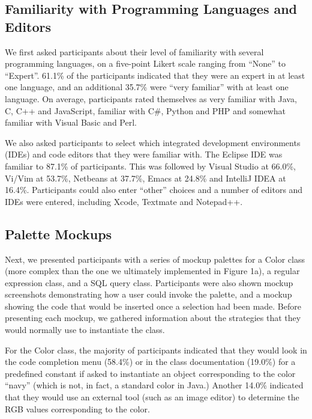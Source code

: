 \documentclass[10pt, conference, compsocconf]{IEEEtran}
\begin{document}
\subsection{Familiarity with Programming Languages and Editors}

We first asked participants about their level of familiarity with several programming languages, on a five-point Likert scale ranging from ``None'' to ``Expert''. 61.1\% of the participants indicated that they were an expert in at least one language, and an additional 35.7\% were ``very familiar'' with at least one language. On average, participants rated themselves as very familiar with Java, C, C++ and JavaScript, familiar with C\#, Python and PHP and somewhat familiar with Visual Basic and Perl.

We also asked participants to select which integrated development environments (IDEs) and code editors that they were familiar with. The Eclipse IDE was familiar to 87.1\% of participants. This was followed by Visual Studio at 66.0\%, Vi/Vim at 53.7\%, Netbeans at 37.7\%, Emacs at 24.8\% and IntelliJ IDEA at 16.4\%. Participants could also enter ``other'' choices and a number of editors and IDEs were entered, including Xcode, Textmate and Notepad++.

\subsection{Palette Mockups}

%
Next, we presented participants with a series of mockup palettes for a Color class (more complex than the one we ultimately implemented in Figure 1a), a regular expression class, and a SQL query class. Participants were also shown mockup screenshots demonstrating how a user could invoke the palette, and a mockup showing the code that would be inserted once a selection had been made. Before presenting each mockup, we gathered information about  the strategies that they would normally use to instantiate the class.

For the Color class, the majority of participants indicated that they would look in the code completion menu (58.4\%) or in the class documentation (19.0\%) for a predefined constant if asked to instantiate an object corresponding to the color ``navy'' (which is not, in fact, a standard color in Java.) Another 14.0\% indicated that they would use an external tool (such as an image editor) to determine the RGB values corresponding to the color. 
 
\end{document}
